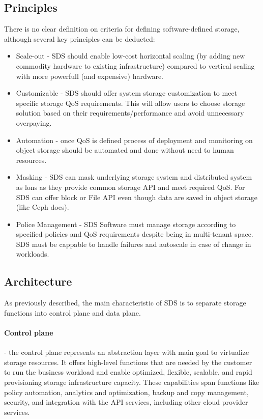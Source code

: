     \subsection{Principles}
    There is no clear definition on criteria for defining software-defined storage, although several key principles can be deducted\cite{sdsGPCloudStorage}:
    \begin{itemize}
        \item Scale-out - SDS should enable low-cost horizontal scaling (by adding new commodity hardware to existing infrastructure) compared to vertical scaling with more powerfull (and expensive) hardware.
        \item Customizable - SDS should offer system storage customization to meet specific storage QoS requirements. This will allow users to choose storage solution based on their requirements/performance and avoid unnecessary overpaying.
        \item Automation - once QoS is defined process of deployment and monitoring on object storage should be automated and done without need to human resources.
        \item Masking - SDS can mask underlying storage system and distributed system as lons as they provide common storage API and meet required QoS. For SDS can offer block or File API even though data are saved in object storage (like Ceph does).
        \item Police Management - SDS Software must manage storage according to specified policies and QoS requirements despite being in multi-tenant space. SDS must be cappable to handle failures and autoscale in case of change in workloads.
    \end{itemize}


    \subsection{Architecture}
    As previously described, the main characteristic of SDS is to separate storage functions into control plane and data plane.

    \paragraph{Control plane}
    - the control plane represents an abstraction layer with main goal to virtualize storage resources. It offers high-level functions that are needed by the customer to run the business workload and enable optimized, flexible, scalable, and rapid provisioning storage infrastructure capacity. These capabilities span functions like policy automation, analytics and optimization, backup and copy management, security, and integration with the API services, including other cloud provider services\cite{sdsIBMSDSGuide}.

